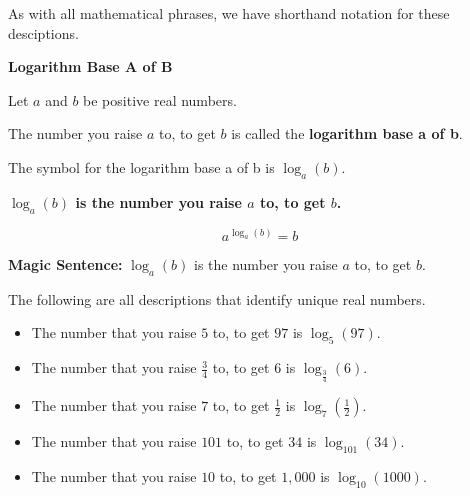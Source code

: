 \documentclass{ximera}
\begin{document}
As with all mathematical phrases, we have shorthand notation for these desciptions.








\begin{definition} \textbf{\textcolor{green!50!black}{Logarithm Base A of B}}

Let $a$ and $b$ be positive real numbers.  



\begin{center}
The number  you raise $a$ to, to get $b$ is called the \textbf{logarithm base a of b}.
\end{center}


The symbol for the logarithm base a of b is $\log_a(b)$.

\begin{center}
\textbf{\textcolor{red!75!green}{$\log_a(b)$ is  the number you raise $a$ to, to get $b$.}} 
\end{center}


\[     a^{\log_a(b)} = b          \]




\end{definition}

\textbf{Magic Sentence:} $\log_a(b)$ is the number you raise $a$ to, to get $b$.



\begin{example}

The following are all descriptions that identify unique real numbers.

\begin{itemize}
\item The number that you raise $5$ to, to get $97$ is $\log_5(97)$. 
\item The number that you raise $\frac{3}{4}$ to, to get $6$ is $\log_{\tfrac{3}{4}}(6)$. 
\item The number that you raise $7$ to, to get $\frac{1}{2}$ is $\log_7\left(\frac{1}{2}\right)$. 
\item The number that you raise $101$ to, to get $34$ is $\log_{101}(34)$. 
\item The number that you raise $10$ to, to get $1,000$ is $\log_{10}(1000)$. 
\end{itemize}

\end{example}
\end{document}
